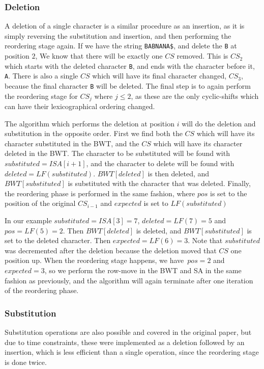 \subsubsection{Deletion}

A deletion of a single character is a similar procedure as an insertion, as it is simply
reversing the substitution and insertion, and then performing the reordering stage again.
If we have the string \verb|BABNANA$|, and delete the \verb|B| at position $2$, We know
that there will be exactly one $CS$ removed. This is $CS_2$ which starts with the deleted
character \verb|B|, and ends with the character before it, \verb|A|. There is also a
single $CS$ which will have its final character changed, $CS_3$, because the final
character \verb|B| will be deleted. The final step is to again perform the reordering
stage for $CS_j$ where $j \leq 2$, as these are the only cyclic-shifts which can have
their lexicographical ordering changed.

The algorithm which performs the deletion at position $i$ will do the deletion and
substitution in the opposite order. First we find both the $CS$ which will have its
character substituted in the BWT, and the $CS$ which will have its character deleted in
the BWT. The character to be substituted will be found with $substituted = ISA[i + 1]$,
and the character to delete will be found with $deleted = LF(substituted)$. $BWT[deleted]$
is then deleted, and $BWT[substituted]$ is substituted with the character that was
deleted. Finally, the reordering phase is performed in the same fashion, where $pos$ is
set to the position of the original $CS_{i - 1}$ and $expected$ is set to $LF(substituted)$

In our example $substituted = ISA[3] = 7$, $deleted = LF(7) = 5$ and $pos = LF(5) = 2$.
Then $BWT[deleted]$ is deleted, and $BWT[substituted]$ is set to the deleted character.
Then $expected = LF(6) = 3$. Note that $substituted$ was decremented after the deletion
because the deletion moved that $CS$ one position up. When the reordering stage happens,
we have $pos = 2$ and $expected = 3$, so we perform the row-move in the BWT and SA in the
same fashion as previously, and the algorithm will again terminate after one iteration of
the reordering phase.

\subsubsection{Substitution}

Substitution operations are also possible and covered in the original paper, but due to
time constraints, these were implemented as a deletion followed by an insertion, which is
less efficient than a single operation, since the reordering stage is done twice.

